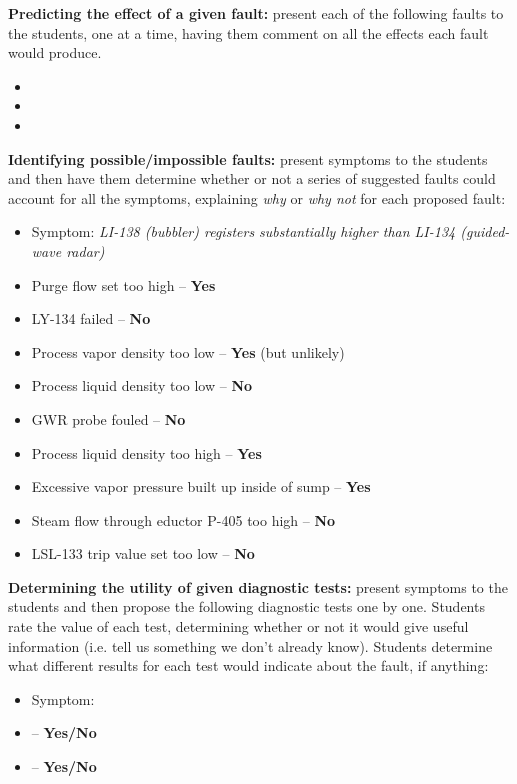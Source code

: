 \noindent
{\bf Predicting the effect of a given fault:} present each of the following faults to the students, one at a time, having them comment on all the effects each fault would produce.

\begin{itemize}
\item{} 
\item{} 
\item{} 
\end{itemize}


\vskip 10pt


\noindent
{\bf Identifying possible/impossible faults:} present symptoms to the students and then have them determine whether or not a series of suggested faults could account for all the symptoms, explaining {\it why} or {\it why not} for each proposed fault:

\begin{itemize}
\item{} Symptom: {\it LI-138 (bubbler) registers substantially higher than LI-134 (guided-wave radar)}
\item{} Purge flow set too high -- {\bf Yes}
\item{} LY-134 failed -- {\bf No}
\item{} Process vapor density too low -- {\bf Yes} (but unlikely)
\item{} Process liquid density too low -- {\bf No}
\item{} GWR probe fouled -- {\bf No}
\item{} Process liquid density too high -- {\bf Yes}
\item{} Excessive vapor pressure built up inside of sump -- {\bf Yes}
\item{} Steam flow through eductor P-405 too high -- {\bf No}
\item{} LSL-133 trip value set too low -- {\bf No}
\end{itemize}


\vskip 10pt


\noindent
{\bf Determining the utility of given diagnostic tests:} present symptoms to the students and then propose the following diagnostic tests one by one.  Students rate the value of each test, determining whether or not it would give useful information (i.e. tell us something we don't already know).  Students determine what different results for each test would indicate about the fault, if anything:

\begin{itemize}
\item{} Symptom: {\it }
\item{}  -- {\bf Yes/No}
\item{}  -- {\bf Yes/No}
\end{itemize}


